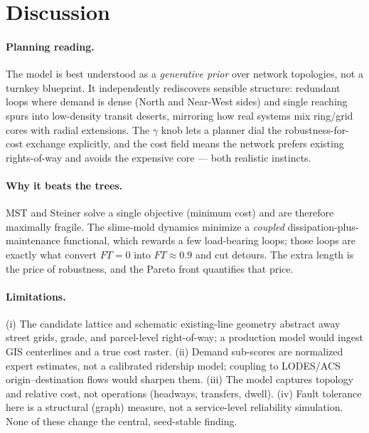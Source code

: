 \documentclass[11pt]{article}
\begin{document}
\section{Discussion}
\paragraph{Planning reading.} The model is best understood as a \emph{generative
prior} over network topologies, not a turnkey blueprint. It independently rediscovers
sensible structure: redundant loops where demand is dense (North and Near-West sides) and
single reaching spurs into low-density transit deserts, mirroring how real systems mix
ring/grid cores with radial extensions. The $\gamma$ knob lets a planner dial the
robustness-for-cost exchange explicitly, and the cost field means the network prefers
existing rights-of-way and avoids the expensive core --- both realistic instincts.

\paragraph{Why it beats the trees.} MST and Steiner solve a single objective (minimum cost)
and are therefore maximally fragile. The slime-mold dynamics minimize a \emph{coupled}
dissipation-plus-maintenance functional, which rewards a few load-bearing loops; those loops
are exactly what convert $FT=0$ into $FT\approx 0.9$ and cut detours. The extra length is the
price of robustness, and the Pareto front quantifies that price.

\paragraph{Limitations.} (i) The candidate lattice and schematic existing-line geometry
abstract away street grids, grade, and parcel-level right-of-way; a production model would
ingest GIS centerlines and a true cost raster. (ii) Demand sub-scores are normalized expert
estimates, not a calibrated ridership model; coupling to LODES/ACS origin--destination flows
would sharpen them. (iii) The model captures topology and relative cost, not operations
(headways, transfers, dwell). (iv) Fault tolerance here is a structural (graph) measure, not a
service-level reliability simulation. None of these change the central, seed-stable finding.

\end{document}

